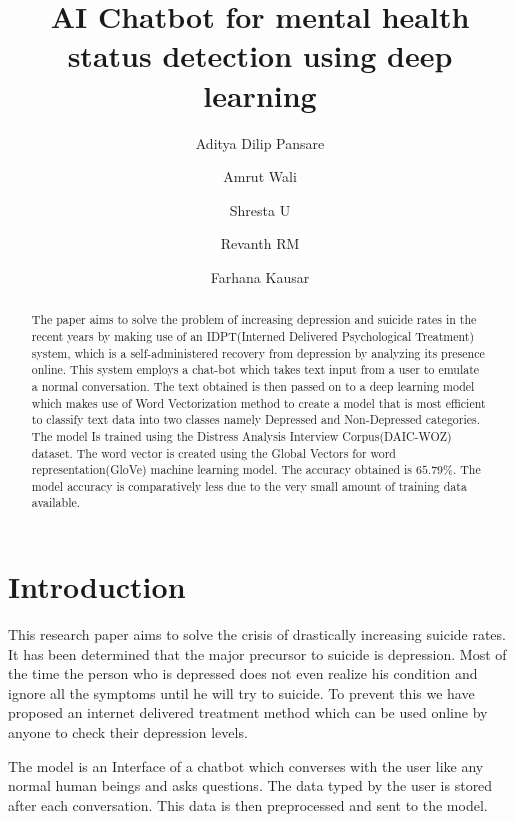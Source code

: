 \documentclass[runningheads]{llncs}
\begin{document}
%
\title{AI Chatbot for mental health status detection using deep learning}
%
\author{Aditya Dilip Pansare \and
Amrut Wali \and
Shresta U \and
Revanth RM \and
Farhana Kausar}
%
%
\maketitle
%
\begin{abstract}
The paper aims to solve the problem of increasing depression and suicide rates in the recent years by making use of an IDPT(Interned Delivered Psychological Treatment) system, which is a self-administered recovery from depression by analyzing its presence online. This system employs a chat-bot which takes text input from a user to emulate a normal conversation. The text obtained is then passed on to a deep learning model which makes use of Word Vectorization method to create a model that is most efficient to classify text data into two classes namely Depressed and Non-Depressed categories. The model Is trained using the Distress Analysis Interview Corpus(DAIC-WOZ) dataset. The word vector is created using the Global Vectors for word representation(GloVe) machine learning model. The accuracy obtained is $65.79\%$. The model accuracy is comparatively less due to the very small amount of training data available.

\end{abstract}
%
\section{Introduction}
This research paper aims to solve the crisis of drastically increasing suicide rates. It has been determined that the major precursor to suicide is depression. Most of the time the person who is depressed does not even realize his condition and ignore all the symptoms until he will try to suicide. To prevent this we have proposed an internet delivered treatment method which can be used online by anyone to check their depression levels.

The model is an Interface of a chatbot which converses with the user like any normal human beings and asks questions. The data typed by the user is stored after each conversation. This data is then preprocessed and sent to the model.
\end{document}
